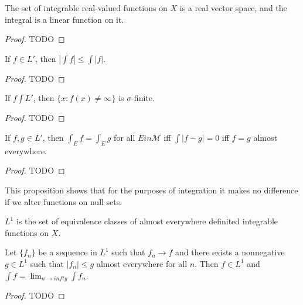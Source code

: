 \begin{proposition}
    The set of integrable real-valued functions on $X$ is a real vector space, and the integral is a linear function on it. 
\end{proposition}

\begin{proof}
    TODO
\end{proof}

\begin{proposition}
    If $f \in L'$, then $|\int f| \le \int |f|$.
\end{proposition}

\begin{proof}
    TODO
\end{proof}

\begin{proposition}
    If $f \int L'$, then $\{ x: f(x) \ne \infty \}$ is $\sigma$-finite.
\end{proposition}

\begin{proof}
    TODO
\end{proof}

\begin{proposition}
    If $f, g \in L'$, then $\int_E f = \int_E g$ for all $E in \mathcal{M}$ iff $\int |f-g| = 0$ iff $f=g$ almost everywhere.
\end{proposition}

\begin{proof}
    TODO
\end{proof}

This proposition shows that for the purposes of integration it makes no difference if we alter functions on null sets.

\begin{definition}
    $L^1$ is the set of equivalence classes of almost everywhere definited integrable functions on $X$.
\end{definition}

\begin{theorem}
    Let $\{ f_n \}$ be a sequence in $L^1$ such that $f_n \to f$ and there exists a nonnegative $g \in L^1$ such that $|f_n| \le g$ almost everywhere for all $n$. Then $f \in L^1$ and $\int f = \lim_{n \to infty} \int f_n$.
\end{theorem}

\begin{proof}
    TODO
\end{proof}

